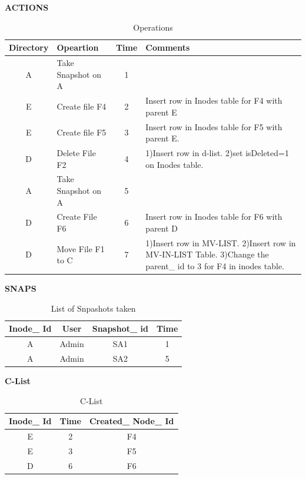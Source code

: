 \begin{table}[!h]
\textbf{ACTIONS}\\

\begin{tabular}{|c|p{4cm}|c|p{8cm}|}
\hline
Directory&Opeartion&Time&Comments\\
\hline
A&Take Snapshot on A&1& \\
\hline
E&Create file F4&2&Insert row in Inodes table for F4 with parent E\\
\hline
E&Create file F5&3&Insert row in Inodes table for F5 with parent E.\\
\hline
D&Delete File F2&4&
1)Insert row in d-list. 2)set isDeleted=1 on Inodes table.\\
\hline
A&Take Snapshot on A&5& \\
\hline
D&Create File F6&6&Insert row in Inodes table for F6 with parent D\\
\hline
D&Move File F1 to C&7&1)Insert row in MV-LIST.
 2)Insert row in MV-IN-LIST Table.
 3)Change the parent\_ id to 3 for F4 in inodes table.\\
\hline
\end{tabular}
\caption{Operations}
\label{table:Actions}
\end{table}
\pagebreak

\begin{table}[!h]
\textbf{SNAPS}\\

\begin{tabular}{|c|c|c|c|}
\hline
Inode\_ Id&User&Snapshot\_ id&Time\\
\hline
A&Admin&SA1&1\\
\hline
A&Admin&SA2&5\\
\hline
\end{tabular}
\caption{List of Snpashots taken}
\label{table:snaps}
\end{table}


\begin{table}[!h]
\textbf{C-List}\\

\begin{tabular}{|c|c|c|}
\hline
Inode\_ Id&Time&Created\_ Node\_ Id\\
\hline
E&2&F4\\
\hline
E&3&F5\\
\hline
D&6&F6\\
\hline
\end{tabular}
\caption{C-List}
\label{table:clist}
\end{table}

